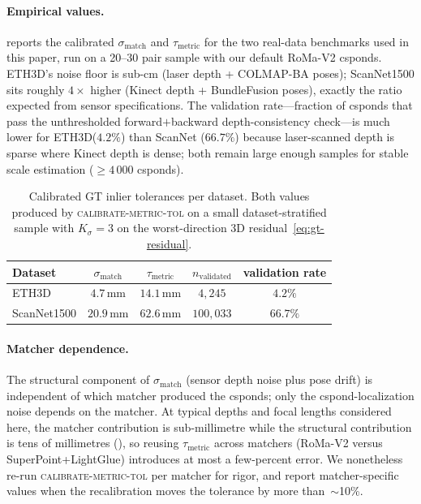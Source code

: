 \documentclass{article}
\newcommand{\mname}[1]{\texorpdfstring{#1\xspace}{#1}}
\newcommand{\ethd}{\mname{ETH3D}}
\newcommand{\lightglue}{\mname{LightGlue}}
\begin{document}
		\paragraph{Empirical values.}
		 reports the calibrated
	$\sigma_{\mathrm{match}}$ and $\tau_{\mathrm{metric}}$ for the two
		real-data benchmarks used in this paper, run on a 20--30 pair
		sample with our default RoMa-V2 csponds.  \ethd's noise
		floor is sub-cm (laser depth + COLMAP-BA poses); ScanNet1500
		sits roughly $4\!\times$ higher (Kinect depth + BundleFusion
		poses), exactly the ratio expected from sensor specifications.
		The validation rate---fraction of csponds that pass the
		unthresholded forward$+$backward depth-consistency check---is
		much lower for \ethd ($4.2\%$) than ScanNet ($66.7\%$) because
		laser-scanned depth is sparse where Kinect depth is dense; both
		remain large enough samples for stable scale estimation
		($\geq 4\,000$ csponds).
		\begin{table}[t]
			\centering\small
			\begin{tabular}{lcccc}
				\toprule
				Dataset     & $\sigma_{\mathrm{match}}$ & $\tau_{\mathrm{metric}}$
				            & $n_{\mathrm{validated}}$  & validation rate          \\
				\midrule
				\ethd       & $4.7\,$mm                 & $14.1\,$mm
				            & $4{,}245$                 & $4.2\%$                  \\
				ScanNet1500 & $20.9\,$mm                & $62.6\,$mm
				            & $100{,}033$               & $66.7\%$                 \\
				\bottomrule
			\end{tabular}
			\caption{Calibrated GT inlier tolerances per dataset.  Both
				values produced by \textsc{calibrate-metric-tol} on a small
				dataset-stratified sample with $K_\sigma{=}3$ on the worst-direction
				3D residual~\eqref{eq:gt-residual}.}
			\label{tab:gt-tolerance-empirical}
		\end{table}

		\paragraph{Matcher dependence.}
		The structural component of $\sigma_{\mathrm{match}}$ (sensor
		depth noise plus pose drift) is independent of which matcher
		produced the csponds; only the cspond-localization noise depends
		on the matcher.  At typical depths and focal lengths considered
		here, the matcher contribution is sub-millimetre while the
		structural contribution is tens of millimetres
		(), so reusing
	$\tau_{\mathrm{metric}}$ across matchers
		(RoMa-V2 versus SuperPoint+\lightglue) introduces at most a
		few-percent error.  We nonetheless re-run
		\textsc{calibrate-metric-tol} per matcher for rigor, and report
		matcher-specific values when the recalibration moves the
		tolerance by more than~$\sim$10\%.
\end{document}
